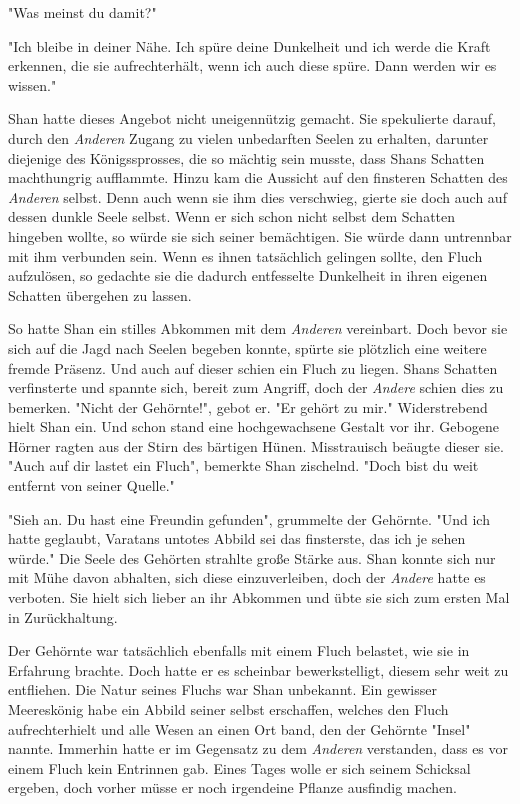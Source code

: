 \documentclass[10pt, a4paper, oneside]{book}
\begin{document}
\begin{multicols}{2}
"Was meinst du damit?"\bigskip

"Ich bleibe in deiner Nähe. Ich spüre deine Dunkelheit und ich werde die Kraft erkennen, die sie aufrechterhält, wenn ich auch diese spüre. Dann werden wir es wissen."\bigskip

Shan hatte dieses Angebot nicht uneigennützig gemacht. Sie spekulierte darauf, durch den \textit{Anderen} Zugang zu vielen unbedarften Seelen zu erhalten, darunter diejenige des Königssprosses, die so mächtig sein musste, dass Shans Schatten machthungrig aufflammte. Hinzu kam die Aussicht auf den finsteren Schatten des \textit{Anderen} selbst. Denn auch wenn sie ihm dies verschwieg, gierte sie doch auch auf dessen dunkle Seele selbst. Wenn er sich schon nicht selbst dem Schatten hingeben wollte, so würde sie sich seiner bemächtigen. Sie würde dann untrennbar mit ihm verbunden sein. Wenn es ihnen tatsächlich gelingen sollte, den Fluch aufzulösen, so gedachte sie die dadurch entfesselte Dunkelheit in ihren eigenen Schatten übergehen zu lassen.\bigskip

So hatte Shan ein stilles Abkommen mit dem \textit{Anderen} vereinbart. Doch bevor sie sich auf die Jagd nach Seelen begeben konnte, spürte sie plötzlich eine weitere fremde Präsenz. Und auch auf dieser schien ein Fluch zu liegen. Shans Schatten verfinsterte und spannte sich, bereit zum Angriff, doch der \textit{Andere} schien dies zu bemerken. "Nicht der Gehörnte!", gebot er. "Er gehört zu mir." Widerstrebend hielt Shan ein. Und schon stand eine hochgewachsene Gestalt vor ihr. Gebogene Hörner ragten aus der Stirn des bärtigen Hünen. Misstrauisch beäugte dieser sie. "Auch auf dir lastet ein Fluch", bemerkte Shan zischelnd. "Doch bist du weit entfernt von seiner Quelle."\bigskip

"Sieh an. Du hast eine Freundin gefunden", grummelte der Gehörnte. "Und ich hatte geglaubt, Varatans untotes Abbild sei das finsterste, das ich je sehen würde." Die Seele des Gehörten strahlte große Stärke aus. Shan konnte sich nur mit Mühe davon abhalten, sich diese einzuverleiben, doch der \textit{Andere} hatte es verboten. Sie hielt sich lieber an ihr Abkommen und übte sie sich zum ersten Mal in Zurückhaltung.\bigskip

Der Gehörnte war tatsächlich ebenfalls mit einem Fluch belastet, wie sie in Erfahrung brachte. Doch hatte er es scheinbar bewerkstelligt, diesem sehr weit zu entfliehen. Die Natur seines Fluchs war Shan unbekannt. Ein gewisser Meereskönig habe ein Abbild seiner selbst erschaffen, welches den Fluch aufrechterhielt und alle Wesen an einen Ort band, den der Gehörnte "Insel" nannte. Immerhin hatte er im Gegensatz zu dem \textit{Anderen} verstanden, dass es vor einem Fluch kein Entrinnen gab. Eines Tages wolle er sich seinem Schicksal ergeben, doch vorher müsse er noch irgendeine Pflanze ausfindig machen.\bigskip


\end{multicols}
\end{document}

